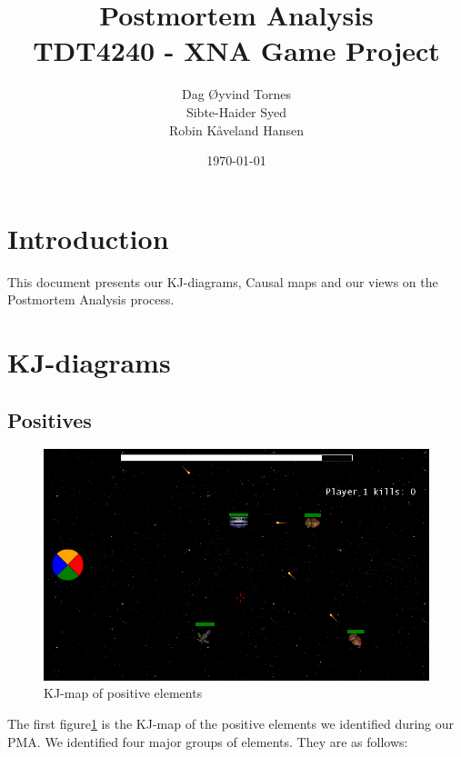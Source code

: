 \documentclass[titlepage,a4paper,11pt]{article}
\date{\today}
\begin{document}
\title{Postmortem Analysis\\
 		TDT4240 - XNA Game Project}

\author{Dag Øyvind Tornes\\
 		Sibte-Haider Syed\\ 
		Robin Kåveland Hansen\\}
\maketitle

\pagestyle{empty}
\tableofcontents
\clearpage
\pagestyle{plain}

\section{Introduction}
This document presents our KJ-diagrams, Causal maps and our views
on the Postmortem Analysis process.

\section{KJ-diagrams}

\subsection{Positives}
\begin{figure}
    \begin{center}
    \includegraphics[width=\linewidth]{graphics/ingame}
    \caption{KJ-map of positive elements}
    \label{fig:poskjmap}
    \end{center}
\end{figure}

The first figure\ref{fig:poskjmap} is the KJ-map of the positive elements 
we identified during our PMA. We identified four major groups of elements.
They are as follows:
\end{document}
